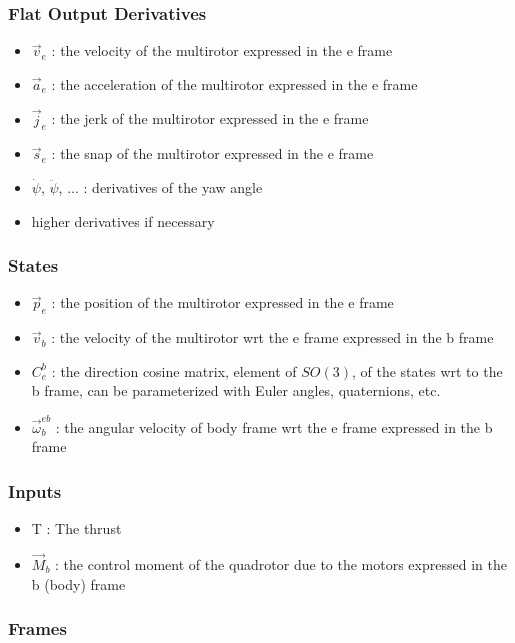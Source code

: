 \documentclass[10pt]{article}
\begin{document}
\subsubsection*{Flat Output Derivatives}
\begin{itemize}
    \item $\vec{v}_e$ : the velocity of the multirotor expressed in the e frame
    \item $\vec{a}_e$ : the acceleration of the multirotor expressed in the e frame
    \item $\vec{j}_e$ : the jerk of the multirotor expressed in the e frame
    \item $\vec{s}_e$ : the snap of the multirotor expressed in the e frame
    \item $\dot{\psi}$, $\ddot{\psi}$, $\ldots{}$ : derivatives of the yaw angle
    \item higher derivatives if necessary
\end{itemize}

\subsubsection*{States}
\begin{itemize}
    \item $\vec{p}_e$ : the position of the multirotor expressed in the e frame
    \item $\vec{v}_b$ : the velocity of the multirotor wrt the e frame expressed in the b frame
    \item $C^b_e$ : the direction cosine matrix, element of $SO(3)$, of the states wrt to the b frame, can be parameterized with Euler angles, quaternions, etc.
    \item $\vec{\omega}^{eb}_b$ : the angular velocity of body frame wrt the e frame expressed in the b frame
\end{itemize}

\subsubsection*{Inputs}
\begin{itemize}
    \item T : The thrust
    \item $\vec{M}_b$ : the control moment of the quadrotor due to the motors expressed in the b (body) frame
\end{itemize}

\subsubsection*{Frames}
\end{document}

